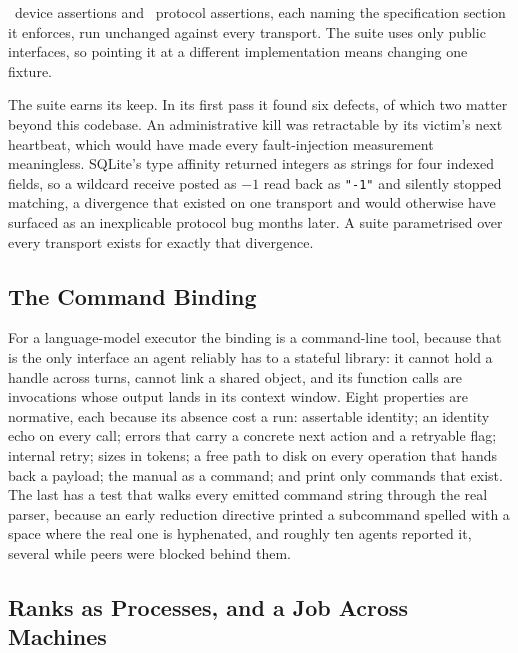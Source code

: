 \documentclass[sigconf,nonacm]{acmart}
\newcommand{\code}[1]{\texttt{\small #1}}
\begin{document}
\nDeviceTests\ device assertions and \nProtocolTests\ protocol assertions, each
naming the specification section it enforces, run unchanged against every
transport. The suite uses only public interfaces, so pointing it at a different
implementation means changing one fixture.

The suite earns its keep. In its first pass it found six defects, of which two
matter beyond this codebase. An administrative kill was retractable by its
victim's next heartbeat, which would have made every fault-injection measurement
meaningless. SQLite's type affinity returned integers as strings for four indexed
fields, so a wildcard receive posted as $-1$ read back as \code{"-1"} and
silently stopped matching, a divergence that existed on one transport and would
otherwise have surfaced as an inexplicable protocol bug months later. A suite
parametrised over every transport exists for exactly that divergence.

\subsection{The Command Binding}
\label{sec:binding}

For a language-model executor the binding is a command-line tool, because that
is the only interface an agent reliably has to a stateful library: it cannot hold
a handle across turns, cannot link a shared object, and its function calls are
invocations whose output lands in its context window. Eight properties are
normative, each because its absence cost a run: assertable identity; an identity
echo on every call; errors that carry a concrete next action and a retryable
flag; internal retry; sizes in tokens; a free path to disk on every operation
that hands back a payload; the manual as a command; and print only commands that
exist. The last has a test that walks every emitted command string through the
real parser, because an early reduction directive printed a subcommand spelled
with a space where the real one is hyphenated, and roughly ten agents reported
it, several while peers were blocked behind them.

\subsection{Ranks as Processes, and a Job Across Machines}
\label{sec:procs}
\end{document}

